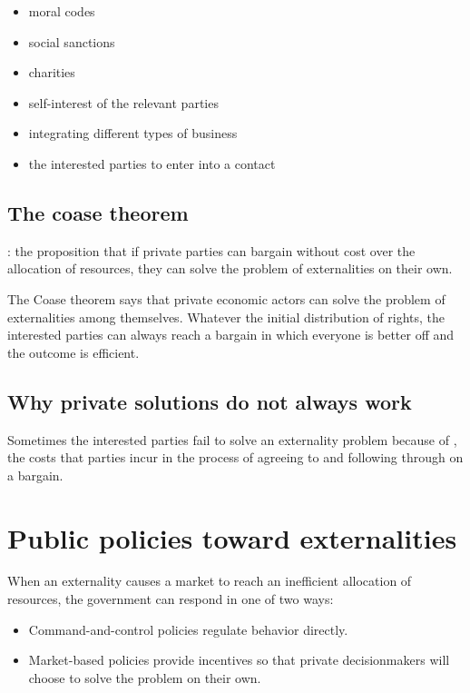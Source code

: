 \begin{itemize}
\item moral codes
\item social sanctions
\item charities
\item self-interest of the relevant parties
\item integrating different types of business
\item the interested parties to enter into a contact
\end{itemize}


\subsection{The coase theorem}

:
the proposition that if private parties can bargain without cost over the allocation of resources, they can solve the problem of externalities on their own.


The Coase theorem says that private economic actors can solve the problem of externalities among themselves. Whatever the initial distribution of rights, the interested parties can always reach a bargain in which everyone is better off and the outcome is efficient.



\subsection{Why private solutions do not always work}

Sometimes the interested parties fail to solve an externality problem because of , the costs that parties incur in the process of agreeing to and following through on a bargain.




\section{Public policies toward externalities}

When an externality causes a market to reach an inefficient allocation of resources, the government can respond in one of two ways:
\begin{itemize}
\item Command-and-control policies regulate behavior directly. 
\item Market-based policies provide incentives so that private decisionmakers will choose to solve the problem on their own.
\end{itemize}



